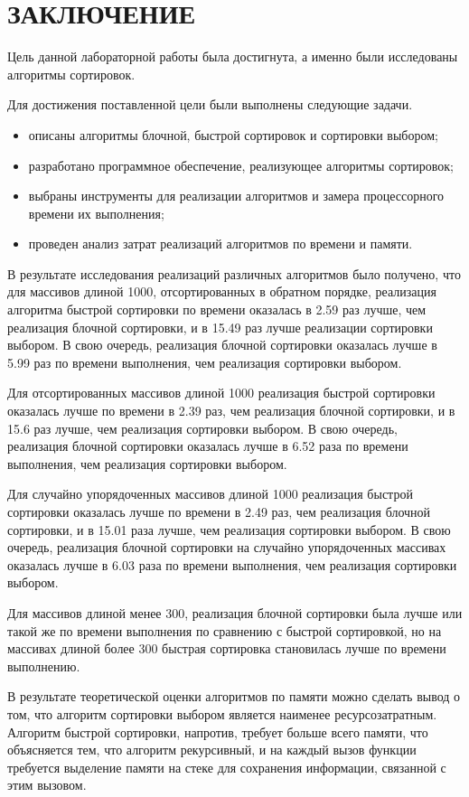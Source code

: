 \chapter*{ЗАКЛЮЧЕНИЕ}

Цель данной лабораторной работы была достигнута, а именно были исследованы алгоритмы сортировок.

Для достижения поставленной цели были выполнены следующие задачи.
\begin{itemize}
	\item описаны алгоритмы блочной, быстрой сортировок и сортировки выбором;
	\item разработано программное обеспечение, реализующее алгоритмы сортировок;
	\item выбраны инструменты для реализации алгоритмов и замера процессорного времени их выполнения;
	\item проведен анализ затрат реализаций алгоритмов по времени и памяти. 
\end{itemize}

В результате исследования реализаций различных алгоритмов было получено, что для массивов длиной 1000, отсортированных в обратном порядке, реализация алгоритма быстрой сортировки по времени оказалась в 2.59 раз лучше, чем реализация блочной сортировки, и в 15.49 раз лучше реализации сортировки выбором.
В свою очередь, реализация блочной сортировки оказалась лучше в 5.99 раз по времени выполнения, чем реализация  сортировки выбором.

Для отсортированных массивов длиной 1000 реализация быстрой сортировки оказалась лучше по времени в 2.39 раз, чем реализация блочной сортировки, и в 15.6 раз лучше, чем реализация сортировки выбором. 
В свою очередь, реализация блочной сортировки оказалась лучше в 6.52 раза по времени выполнения, чем реализация сортировки выбором.

Для случайно упорядоченных массивов длиной 1000 реализация быстрой сортировки оказалась лучше по времени в 2.49 раз, чем реализация блочной сортировки, и в 15.01 раза лучше, чем реализация сортировки выбором. 
В свою очередь, реализация блочной сортировки на случайно упорядоченных массивах оказалась лучше в 6.03 раза по времени выполнения, чем реализация сортировки выбором.

Для массивов длиной менее 300, реализация блочной сортировки была лучше или такой же по времени выполнения по сравнению с быстрой сортировкой, но на массивах длиной более 300 быстрая сортировка становилась лучше по времени выполнению.

В результате теоретической оценки алгоритмов по памяти можно сделать вывод о том, что алгоритм сортировки выбором является наименее ресурсозатратным.
Алгоритм быстрой сортировки, напротив, требует больше всего памяти, что объясняется тем, что алгоритм рекурсивный, и на каждый вызов функции требуется выделение памяти на стеке для сохранения информации, связанной с этим вызовом.